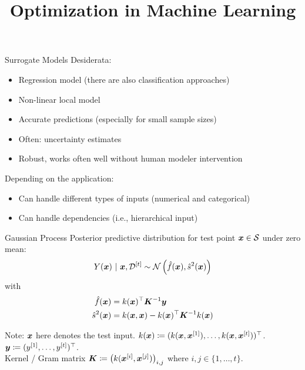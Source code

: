 \documentclass[11pt,compress,t,notes=noshow, xcolor=table]{beamer}
\title{Optimization in Machine Learning}
\begin{document}

\begin{framev}{Surrogate Models}
Desiderata:

\begin{itemize}
\item Regression model (there are also classification approaches)
\item Non-linear local model
\item Accurate predictions (especially for small sample sizes)
\item Often: uncertainty estimates
\item Robust, works often well without human modeler intervention
\end{itemize}
\spacer
Depending on the application:
\begin{itemize}
\item Can handle different types of inputs (numerical and categorical)
\item Can handle dependencies (i.e., hierarchical input)
\end{itemize}
\end{framev}


\begin{framev}[fs=small]{Gaussian Process}
Posterior predictive distribution for test point $\bm{x} \in \mathcal{S}$ under zero mean:
$$
Y(\bm{x}) ~|~ \bm{x}, \mathcal{D}^{[t]} \sim \mathcal{N}\left(\hat{f}(\bm{x}), \hat{s}^2(\bm{x})\right)
$$
with
$$
\begin{aligned}
\hat{f}(\bm{x}) &= k(\bm{x})^\top \bm{K}^{-1} \bm{y} \\
\hat{s}^2(\bm{x}) &= k(\bm{x}, \bm{x}) - k(\bm{x})^\top \bm{K}^{-1} k(\bm{x})
\end{aligned}
$$
\begin{footnotesize}
Note: $\bm{x}$ here denotes the test input.
$k(\bm{x}) \coloneqq (k(\bm{x}, \bm{x}^{[1]}), \ldots, k(\bm{x}, \bm{x}^{[t]}))^\top$.
$\bm{y} \coloneqq (y^{[1]}, \ldots, y^{[t]})^\top$. \\
Kernel / Gram matrix $\bm{K} \coloneqq \left(k(\bm{x}^{[i]}, \bm{x}^{[j]})\right)_{i,j}$ where $i, j \in \{1, \ldots, t\}.$
\end{footnotesize}
\end{framev}
\end{document}
